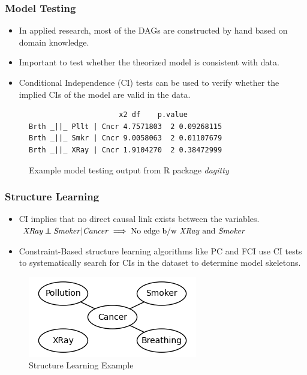 \documentclass{beamer}
\def\ci{\perp\!\!\!\!\!\perp}
\begin{document}
\begin{frame}[fragile]
	\frametitle{Model Testing}
	\begin{itemize}
		\item In applied research, most of the DAGs are constructed by hand
			based on domain knowledge.
		\item Important to test whether the theorized model is consistent with data.
		\item Conditional Independence (CI) tests can be used to verify whether the implied
			CIs of the model are valid in the data.
	\end{itemize}

	\begin{figure}
		\centering
 		\begin{BVerbatim}
		             x2 df    p.value
Brth _||_ Pllt | Cncr 4.7571803  2 0.09268115
Brth _||_ Smkr | Cncr 9.0058063  2 0.01107679
Brth _||_ XRay | Cncr 1.9104270  2 0.38472999
 		\end{BVerbatim}
		\caption*{Example model testing output from R package \emph{dagitty}}
	\end{figure}
\end{frame}

\begin{frame}
	\frametitle{Structure Learning}
	\begin{itemize}
		\setlength\itemsep{1em}
		\item CI implies that no direct causal link exists between the variables. \newline
			$ \text{\emph{XRay}} \ci \text{\emph{Smoker}} | \text{\emph{Cancer}} \implies \text{No edge b/w \emph{XRay} and \emph{Smoker}} $

		\item Constraint-Based structure learning algorithms like PC
			and FCI use CI tests to systematically search for CIs
			in the dataset to determine model skeletons.
	\end{itemize}
	\begin{figure}
		\centering
		\includegraphics[scale=0.6]{imgs/example_sl.png}
		\caption*{Structure Learning Example}
	\end{figure}
\end{frame}
\end{document}
